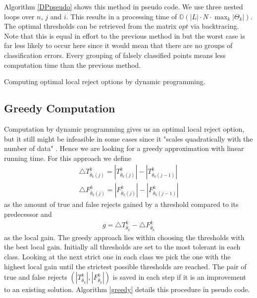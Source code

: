 Algorithm \ref{DPpseudo} shows this method in pseudo code. We use three nested loops over $n$, $j$ and $i$. This results in a processing time of $\mathbb{O}(|L| \cdot N \cdot \max_k \left|\Theta_k\right|)$. The optimal thresholds can be retrieved from the matrix $opt$ via backtracing.
Note that this is equal in effort to the previous method in \cite{Fis:2015} but the worst case is far less likely to occur here since it would mean that there are no groups of classification errors. Every grouping of falsely classified points means less computation time than the previous method.

\begin{algorithm}[!htbp]
\BlankLine \BlankLine
\caption{Computing optimal local reject options by dynamic programming.}
\label{DPpseudo}
\end{algorithm}
\newpage

\subsection{Greedy Computation}
\label{greedyAlg}
Computation by dynamic programming gives us an optimal local reject option, but it still might be infeasible in some cases since it "scales quadratically with the number of data" \cite{Fis:2015}. Hence we are looking for a greedy approximation with linear running time. For this approach we define
\begin{align}
 	\bigtriangleup T_{\bar{\theta}_k(j)}^k = \left|T_{\bar{\theta}_k(j)}^k\right|-\left|T_{\bar{\theta}_k(j-1)}^k\right| \\
	\bigtriangleup F_{\bar{\theta}_k(j)}^k = \left|F_{\bar{\theta}_k(j)}^k\right|-\left|F_{\bar{\theta}_k(j-1)}^k\right|
\end{align}
as the amount of true and false rejects gained by a threshold compared to its predecessor and
\begin{align}
g = \bigtriangleup T_{\bar{\theta}_k}^k - \bigtriangleup F_{\bar{\theta}_k}^k
\end{align}
as the local gain. The greedy approach lies within choosing the thresholds with the best local gain. Initially all thresholds are set to the most tolerant in each class. Looking at the next strict one in each class we pick the one with the highest local gain until the strictest possible thresholds are reached. The pair of true and false rejects $\left(\left|T_{\bar{\theta}_k}^k\right|,\left|F_{\bar{\theta}_k}^k\right|\right)$ is saved in each step if it is an improvement to an existing solution. Algorithm \ref{greedy} details this procedure in pseudo code. 


